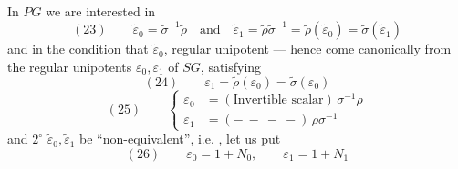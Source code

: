 In $PG$ we are interested in
\[
(23)\qquad
\widetilde\varepsilon_0
=\widetilde\sigma^{-1}\widetilde\rho
\quad\text{and}\quad
\widetilde\varepsilon_1
=\widetilde\rho\widetilde\sigma^{-1}
=\widetilde\rho(\widetilde\varepsilon_0)
=\widetilde\sigma(\widetilde\varepsilon_1)
\]
and in the condition that
$\widetilde\varepsilon_0$,
 regular unipotent —
hence 
come canonically from the
regular unipotents $\varepsilon_0,\varepsilon_1$ of $SG$,
satisfying
\[
(24)\qquad
\varepsilon_1=\widetilde\rho(\varepsilon_0)
=\widetilde\sigma(\varepsilon_0)
\]
\[
(25)\qquad
\left\{
\begin{aligned}
\varepsilon_0&=(\text{Invertible scalar})\,\sigma^{-1}\rho\\
\varepsilon_1&=(-\ -\ -\ -)\,\rho\sigma^{-1}
\end{aligned}
\right.
\]
and \textcircled{\(2^\circ\)}
$\widetilde\varepsilon_0,\widetilde\varepsilon_1$ be
``non-equivalent'',
i.e. , let us put
\[
(26)\qquad
\varepsilon_0=1+N_0,\qquad
\varepsilon_1=1+N_1
\]

